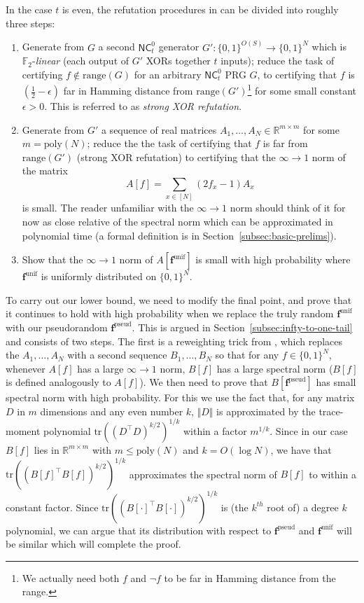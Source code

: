 \documentclass[11pt]{article}
\newcommand{\B}{\{0,1\}}
\newcommand{\rng}{\mathrm{range}}
\newcommand{\poly}{\mathrm{poly}}
\newcommand{\norm}[1]{\Vert #1 \Vert}
\newcommand{\N}{[N]}
\begin{document}
In the case $t$ is even, the refutation procedures in \cite{semirandom,smoothed,simpler-moore} can be divided into roughly three steps:
\begin{enumerate}
    \item Generate from $G$ a second $\mathsf{NC}^0_t$ generator $G':\B^{O(S)} \to \B^N$ which is $\mathbb{F}_2$-\emph{linear} (each output of $G'$ XORs together $t$ inputs); reduce the task of certifying $f \notin \rng(G)$ for an arbitrary $\mathsf{NC}^0_t$ PRG $G$, to certifying that $f$ is $(\frac{1}{2}-\epsilon)$ far in Hamming distance from $\rng(G')$\footnote{We actually need both $f$ and $\lnot f$ to be far in Hamming distance from the range.} for some small constant $\epsilon >0$. This is referred to as \emph{strong XOR refutation}.
    \item Generate from $G'$ a sequence of real matrices $A_1,\ldots,A_N \in \mathbb{R}^{m\times m}$ for some $m = \poly(N)$; reduce the the task of certifying that $f$ is far from $\rng(G')$ (strong XOR refutation) to certifying that the $\infty\to1$ norm of the matrix
    \[
    A[f] = \sum_{x \in \N} (2f_x-1) A_x
    \]
    is small. The reader unfamiliar with the $\infty\to1$ norm should think of it for now as close relative of the spectral norm which can be approximated in polynomial time (a formal definition is in Section~\ref{subsec:basic-prelims}).
    \item Show that the $\infty\to 1$ norm of $A[\bm{f}^{\mathrm{unif}}]$ is small with high probability where $\bm{f}^{\mathrm{unif}}$ is uniformly distributed on $\B^N$.
\end{enumerate}

To carry out our lower bound, we need to modify the final point, and prove that it continues to hold with high probability when we replace the truly random $\bm{f}^{\mathrm{unif}}$ with our pseudorandom $\bm{f}^{\mathrm{pseud}}$. This is argued in Section~\ref{subsec:infty-to-one-tail} and consists of two steps. The first is a reweighting trick from \cite{smoothed}, which replaces the $A_1,\ldots,A_N$ with a second sequence $B_1,\ldots,B_N$ so that for any $f \in \B^N$, whenever $A[f]$ has a large $\infty\to 1$ norm, $B[f]$ has a large spectral norm ($B[f]$ is defined analogously to $A[f]$). We then need to prove that $B[\bm{f}^{\mathrm{pseud}}]$ has small spectral norm with high probability. For this we use the fact that, for any matrix $D$ in $m$ dimensions and any even number $k$, $\norm{D}$ is approximated by the trace-moment polynomial $\mathrm{tr}( (D^\top D)^{k/2})^{1/k}$ within a factor $m^{1/k}$. Since in our case $B[f]$ lies in $\mathbb{R}^{m\times m}$ with $m \leq \poly(N)$ and $k= O(\log N)$, we have that $\mathrm{tr}((B[f]^\top B[f])^{k/2})^{1/k}$ approximates the spectral norm of $B[f]$ to within a constant factor. Since $\mathrm{tr}((B[\cdot ]^\top B[\cdot ])^{k/2})^{1/k}$ is (the $k^{th}$ root of) a degree $k$ polynomial, we can argue that its distribution with respect to $\bm{f}^{\mathrm{pseud}}$ and $\bm{f}^{\mathrm{unif}}$ will be similar which will complete the proof.
\end{document}

